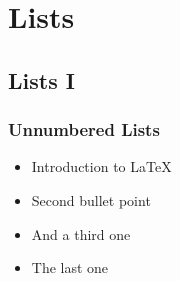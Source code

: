 \documentclass{beamer}
\begin{document}
\section{Lists} 
\subsection{Lists I}
\begin{frame}
   \frametitle{Unnumbered Lists}
   \begin{itemize}
      \item Introduction to  \LaTeX  
      \item Second bullet point 
      \item And a third one
      \item The last one
   \end{itemize} 
\end{frame}
\end{document}
